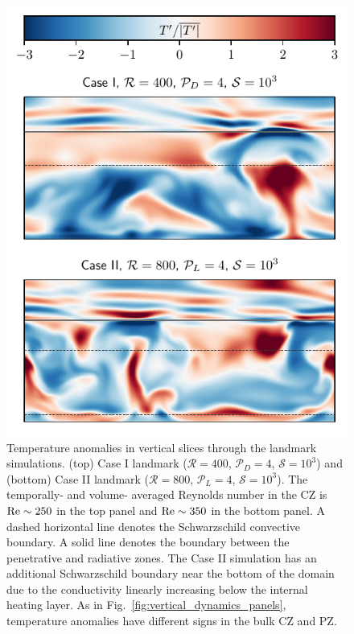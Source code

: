 \documentclass[twocolumn, linenumbers]{aastex631}
\newcommand{\mP}{\ensuremath{\mathcal{P}}}
\newcommand{\mR}{\ensuremath{\mathcal{R}}}
\newcommand{\mS}{\ensuremath{\mathcal{S}}}
\begin{document}
\begin{figure}[t]
\centering
\includegraphics[width=\columnwidth]{lessturb_dynamics_panels.pdf}
\caption{
Temperature anomalies in vertical slices through the landmark simulations.
(top) Case I landmark ($\mR = 400$, $\mP_D = 4$, $\mS = 10^3$) and (bottom) Case II landmark ($\mR = 800$, $\mP_L = 4$, $\mS = 10^3$).
The temporally- and volume- averaged Reynolds number in the CZ is $\rm{Re} \sim 250$ in the top panel and $\rm{Re} \sim 350$ in the bottom panel.
A dashed horizontal line denotes the Schwarzschild convective boundary.
A solid line denotes the boundary between the penetrative and radiative zones.
The Case II simulation has an additional Schwarzschild boundary near the bottom of the domain due to the conductivity linearly increasing below the internal heating layer.
As in Fig.~\ref{fig:vertical_dynamics_panels}, temperature anomalies have different signs in the bulk CZ and PZ.
\label{fig:lessturb_dynamics_panels}
}
\end{figure}
\end{document}

